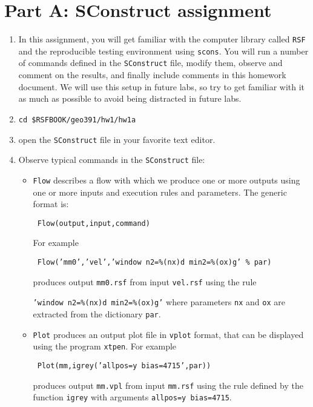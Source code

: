 \section{Part A: SConstruct assignment}

\begin{enumerate}

\item In this assignment, you will get familiar with 
the computer library called \texttt{RSF} and the reproducible testing
environment using \texttt{scons}.
You will run a number of commands defined in the 
\texttt{SConstruct} file, modify them, 
observe and comment on the results, and finally include comments
in this homework document.
We will use this setup in future labs, so try to get familiar with
it as much as possible to avoid being distracted in future labs.

\item \texttt{cd \$RSFBOOK/geo391/hw1/hw1a}

\item open the \texttt{SConstruct} file in your favorite text editor.

\item Observe typical commands in the \texttt{SConstruct} file:
\begin{itemize}
\item \texttt{Flow} describes a flow with which we produce 
one or more outputs using one or more inputs and execution rules and
parameters. The generic format is:
\par
\texttt{ Flow(output,input,command) }
\par
For example
\par
\texttt{ Flow('mm0','vel','window n2=\%(nx)d min2=\%(ox)g' \% par)}
\par
produces output \texttt{mm0.rsf} from input \texttt{vel.rsf} using the rule
\par
\texttt{'window n2=\%(nx)d min2=\%(ox)g'} where parameters
\texttt{nx} and \texttt{ox} are extracted from the dictionary \texttt{par}.

\item \texttt{Plot} produces an output plot file 
in \texttt{vplot} format, that can be displayed using the program 
\texttt{xtpen}.
For example
\par
\texttt{ Plot(mm,igrey('allpos=y bias=4715',par))}
\par
produces output \texttt{mm.vpl} from input 
\texttt{mm.rsf} using the rule defined by the function 
\texttt{igrey} with arguments \texttt{allpos=y bias=4715}.


\end{itemize}
\end{enumerate}
